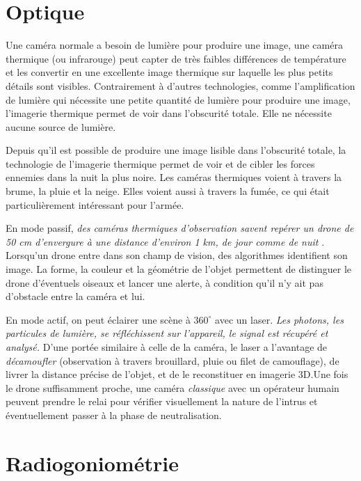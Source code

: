 \section{Optique}

Une caméra normale a besoin de lumière pour produire une image, une caméra thermique (ou infrarouge) peut capter de très faibles différences de température et les convertir en une excellente image thermique sur laquelle les plus petits détails sont visibles. Contrairement à d'autres technologies, comme l'amplification de lumière qui nécessite une petite quantité de lumière pour produire une image, l'imagerie thermique permet de voir dans l'obscurité totale. Elle ne nécessite aucune source de lumière.

Depuis qu'il est possible de produire une image lisible dans l'obscurité totale, la technologie de l'imagerie thermique permet de voir et de cibler les forces ennemies dans la nuit la plus noire. Les caméras thermiques voient à travers la brume, la pluie et la neige. Elles voient aussi à travers la fumée, ce qui était particulièrement intéressant pour l'armée.\cite{optique}

En mode passif, \emph{des caméras thermiques d'observation savent repérer un drone de 50 cm d'envergure à une distance d'environ 1 km, de jour comme de nuit} . Lorsqu'un drone entre dans son champ de vision, des algorithmes identifient son image. La forme, la couleur et la géométrie de l'objet permettent de distinguer le drone d'éventuels oiseaux et lancer une alerte, à condition qu'il n'y ait pas d'obstacle entre la caméra et lui.

En mode actif, on peut éclairer une scène à $360^{\circ}$ avec un laser. \emph{Les photons, les particules de lumière, se réfléchissent sur l'appareil, le signal est récupéré et analysé.} D'une portée similaire à celle de la caméra, le laser a l'avantage de \emph{décamoufler} (observation à travers brouillard, pluie ou filet de camouflage), de livrer la distance précise de l'objet, et de le reconstituer en imagerie 3D.Une fois le drone suffisamment proche, une caméra \textit{classique} avec un opérateur humain peuvent prendre le relai pour vérifier visuellement la nature de l'intrus et éventuellement passer à la phase de neutralisation.



\section{Radiogoniométrie}


